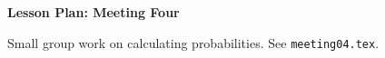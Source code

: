 \documentclass[12pt]{amsart}
\theoremstyle{definition}
\begin{document}
\begin{center}
\textbf{\Huge
Lesson Plan: Meeting Four
}
\end{center}
\vspace{.5in}

Small group work on calculating probabilities.
See \texttt{meeting04.tex}.
\end{document}
